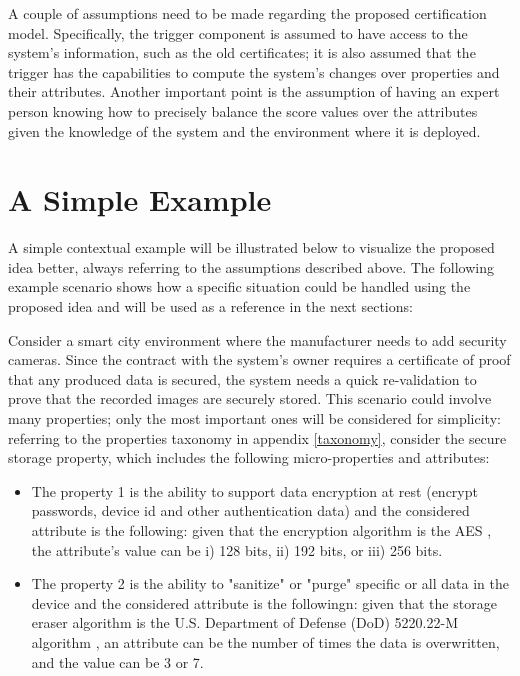 A couple of assumptions need to be made regarding the proposed certification model. Specifically, the trigger component is assumed to have access to the system's information, such as the old certificates; it is also assumed that the trigger has the capabilities to compute the system's changes over properties and their attributes. Another important point is the assumption of having an expert person knowing how to precisely balance the score values over the attributes given the knowledge of the system and the environment where it is deployed.



\section{A Simple Example}
A simple contextual example will be illustrated below to visualize the proposed idea better, always referring to the assumptions described above. The following example scenario shows how a specific situation could be handled using the proposed idea and will be used as a reference in the next sections:

Consider a smart city environment where the manufacturer needs to add security cameras. Since the contract with the system's owner requires a certificate of proof that any produced data is secured, the system needs a quick re-validation to prove that the recorded images are securely stored. This scenario could involve many properties; only the most important ones will be considered for simplicity: referring to the properties taxonomy in appendix \ref{taxonomy}, consider the secure storage property, which includes the following micro-properties and attributes:

\begin{itemize}
    \item The property 1 is the ability to support data encryption at rest (encrypt passwords, device id and other authentication data) and the considered attribute is the following: given that the encryption algorithm is the AES \cite{daemen1999aes}, the attribute's value can be i) 128 bits, ii) 192 bits, or iii) 256 bits.
    
    \item The property 2 is the ability to "sanitize" or "purge" specific or all data in the device and the considered attribute is the followingn: given that the storage eraser algorithm is the U.S. Department of Defense (DoD) 5220.22-M algorithm \cite{fischer2017dod}, an attribute can be the number of times the data is overwritten, and the value can be 3 or 7.
\end{itemize}


